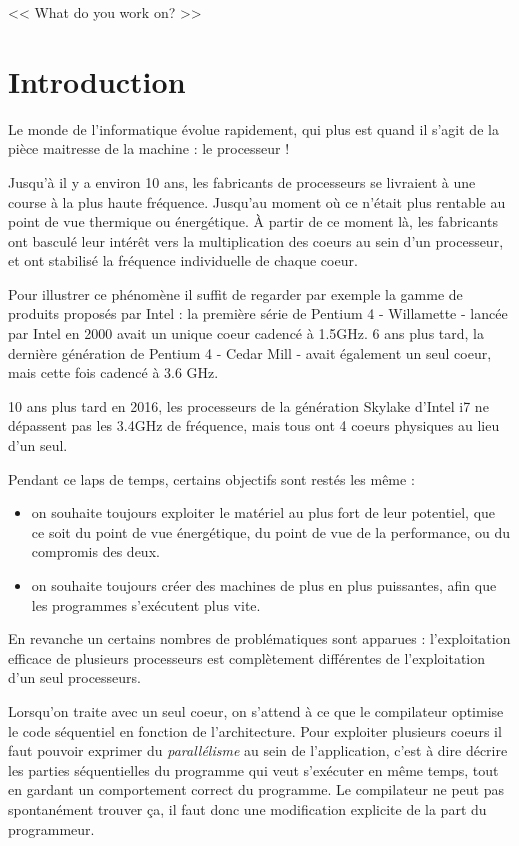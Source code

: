 \begin{savequote}[6cm]
<< What do you work on?  >>
\end{savequote}
\chapter{Introduction}
\chaptertoc

Le monde de l'informatique évolue rapidement, qui plus est quand il s'agit de la pièce maitresse de la machine : le processeur !

Jusqu'à il y a environ 10 ans, les fabricants de processeurs se livraient à une course à la plus haute fréquence.
Jusqu'au moment où ce n'était plus rentable au point de vue thermique ou énergétique. À partir de ce moment là, les fabricants ont basculé leur intérêt vers la multiplication des coeurs au sein d'un processeur, et ont stabilisé la fréquence individuelle de chaque coeur.

Pour illustrer ce phénomène il suffit de regarder par exemple la gamme de produits proposés par Intel : la première série de Pentium 4 - Willamette - lancée par Intel en 2000 avait un unique coeur cadencé à 1.5GHz. 6 ans plus tard, la dernière génération de Pentium 4 - Cedar Mill - avait également un seul coeur, mais cette fois cadencé à 3.6 GHz.

10 ans plus tard en 2016, les processeurs de la génération Skylake d'Intel i7 ne dépassent pas les 3.4GHz de fréquence, mais tous ont 4 coeurs physiques au lieu d'un seul.

Pendant ce laps de temps, certains objectifs sont restés les même :
\begin{itemize}
  \item on souhaite toujours exploiter le matériel au plus fort de leur potentiel, que ce soit du point de vue énergétique, du point de vue de la performance, ou du compromis des deux.
  \item on souhaite toujours créer des machines de plus en plus puissantes, afin que les programmes s'exécutent plus vite.
\end{itemize}

En revanche un certains nombres de problématiques sont apparues : l'exploitation efficace de plusieurs processeurs est complètement différentes de l'exploitation d'un seul processeurs.

Lorsqu'on traite avec un seul coeur, on s'attend à ce que le compilateur optimise le code séquentiel en fonction de l'architecture.
Pour exploiter plusieurs coeurs il faut pouvoir exprimer du \emph{parallélisme} au sein de l'application, c'est à dire décrire les parties séquentielles du programme qui veut s'exécuter en même temps, tout en gardant un comportement correct du programme.
Le compilateur ne peut pas spontanément trouver ça, il faut donc une modification explicite de la part du programmeur.

